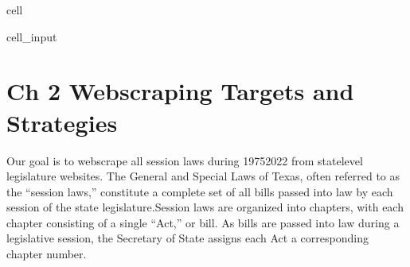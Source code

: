 \documentclass[letterpaper,10pt,english]{jupyterBook}
\begin{document}
\begin{sphinxuseclass}{cell}\begin{sphinxVerbatimInput}

\begin{sphinxuseclass}{cell_input}
\begin{sphinxVerbatim}[commandchars=\\\{\}]
   
   
   
     
   
 
   
   
 
 
 
 
   
 
 
 
   
 
\end{sphinxVerbatim}

\end{sphinxuseclass}\end{sphinxVerbatimInput}

\end{sphinxuseclass}
\sphinxstepscope


\chapter{Ch 2 Webscraping Targets and Strategies}
\label{\detokenize{ch2:ch-2-webscraping-targets-and-strategies}}\label{\detokenize{ch2::doc}}
\sphinxAtStartPar
Our goal is to webscrape all session laws during 1975\sphinxhyphen{}2022 from state\sphinxhyphen{}level legislature websites. The General and Special Laws of Texas, often referred to as the “session laws,” constitute a complete set of all bills passed into law by each session of the state legislature.Session laws are organized into chapters, with each chapter consisting of a single “Act,” or bill. As bills are passed into law during a legislative session, the Secretary of State assigns each Act a corresponding chapter number.
\end{document}
